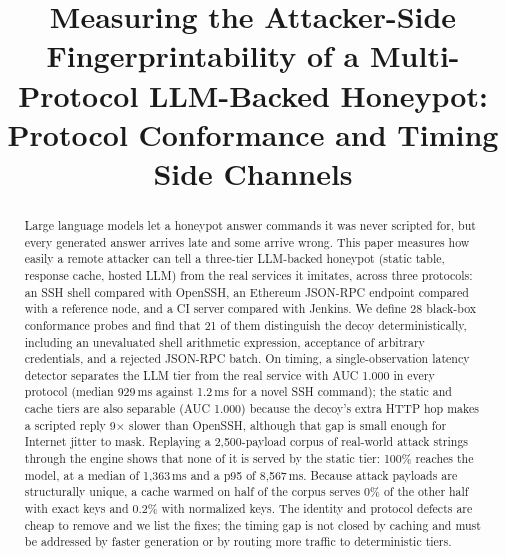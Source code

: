 \documentclass[conference]{IEEEtran}
\begin{document}
\title{Measuring the Attacker-Side Fingerprintability of a Multi-Protocol LLM-Backed Honeypot:\\Protocol Conformance and Timing Side Channels}

\author{
}

\maketitle

\begin{abstract}
Large language models let a honeypot answer commands it was never scripted for, but every generated answer arrives late and some arrive wrong. This paper measures how easily a remote attacker can tell a three-tier LLM-backed honeypot (static table, response cache, hosted LLM) from the real services it imitates, across three protocols: an SSH shell compared with OpenSSH, an Ethereum JSON-RPC endpoint compared with a reference node, and a CI server compared with Jenkins. We define 28 black-box conformance probes and find that 21 of them distinguish the decoy deterministically, including an unevaluated shell arithmetic expression, acceptance of arbitrary credentials, and a rejected JSON-RPC batch. On timing, a single-observation latency detector separates the LLM tier from the real service with AUC 1.000 in every protocol (median 929\,ms against 1.2\,ms for a novel SSH command); the static and cache tiers are also separable (AUC 1.000) because the decoy's extra HTTP hop makes a scripted reply 9$\times$ slower than OpenSSH, although that gap is small enough for Internet jitter to mask. Replaying a 2,500-payload corpus of real-world attack strings through the engine shows that none of it is served by the static tier: 100\% reaches the model, at a median of 1,363\,ms and a p95 of 8,567\,ms. Because attack payloads are structurally unique, a cache warmed on half of the corpus serves 0\% of the other half with exact keys and 0.2\% with normalized keys. The identity and protocol defects are cheap to remove and we list the fixes; the timing gap is not closed by caching and must be addressed by faster generation or by routing more traffic to deterministic tiers.
\end{abstract}
\end{document}
